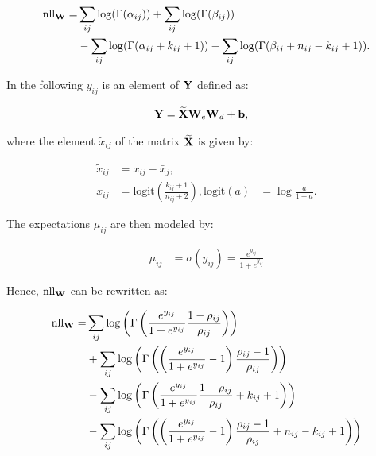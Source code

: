 \begin{align} \label{eq:nll-w}
\text{nll}_{\mathbf{W}} =& \sum_{ij}\log(\Gamma(\alpha_{ij})) + \sum_{ij}\log(\Gamma(\beta_{ij})) \\
&- \sum_{ij}\log(\Gamma(\alpha_{ij}+k_{ij}+1)) - \sum_{ij}\log(\Gamma(\beta_{ij}+n_{ij}-k_{ij}+1)).
\end{align}


In the following $y_{ij}$ is an element of $\mathbf{Y}$ defined as:

\begin{align}\label{eq:Y}
\mathbf{Y} &= \mathbf{\widetilde{X}} \mathbf{W}_e \mathbf{W}_d + \mathbf{b},
\end{align}

where the element $\widetilde{x}_{ij}$ of the matrix $\mathbf{\widetilde{X}}$ is given by: 

\begin{align*}
\widetilde{x}_{ij} &= x_{ij} - \bar{x}_j, \\
x_{ij} &= \text{logit} \left (\frac{k_{ij}+1}{n_{ij}+2} \right),
\text{logit}(a) &= \log \frac{a}{1-a}.
\end{align*}

The expectations $\mu_{ij}$ are then modeled by:

\begin{align*}
\mu_{ij} &= \sigma \left (y_{ij} \right) = \frac{e^{y_{ij}}}{1 + e^{y_{ij}}}
\end{align*}


Hence,  $\text{nll}_{\mathbf{W}}$ can be rewritten as:

\begin{align*}
\text{nll}_{\mathbf{W}} =& \sum_{ij}\log\left(\Gamma\left(\frac{ e^{y_{ij}} }{ 1+e^{y_{ij}} }\frac{ 1-\rho_{ij} }{ \rho_{ij} }\right) \right) \\
&+ \sum_{ij}\log\left(\Gamma\left( \left (\frac{ e^{y_{ij}} }{ 1+e^{y_{ij}} } - 1 \right) \frac{ \rho_{ij} - 1 }{ \rho_{ij} }\right) \right) \\
&- \sum_{ij}\log\left(\Gamma\left(\frac{ e^{y_{ij}} }{ 1+e^{y_{ij}} }\frac{ 1-\rho_{ij} }{ \rho_{ij} } + k_{ij} + 1 \right) \right) \\ 
&- \sum_{ij}\log\left(\Gamma\left( \left (\frac{ e^{y_{ij}} }{ 1+e^{y_{ij}} } - 1 \right) \frac{ \rho_{ij} - 1 }{ \rho_{ij} } + n_{ij} - k_{ij} + 1\right) \right) 
\end{align*}


